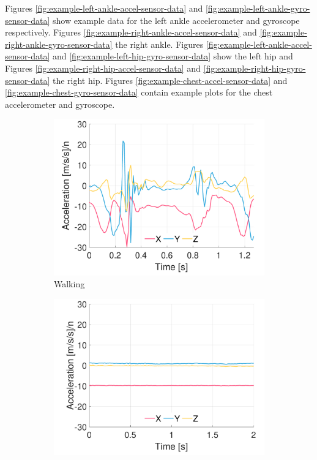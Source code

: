 Figures \ref{fig:example-left-ankle-accel-sensor-data} and \ref{fig:example-left-ankle-gyro-sensor-data} show example data for the left ankle accelerometer and gyroscope respectively. Figures \ref{fig:example-right-ankle-accel-sensor-data} and \ref{fig:example-right-ankle-gyro-sensor-data} the right ankle. Figures \ref{fig:example-left-ankle-accel-sensor-data} and \ref{fig:example-left-hip-gyro-sensor-data} show the left hip and Figures \ref{fig:example-right-hip-accel-sensor-data} and \ref{fig:example-right-hip-gyro-sensor-data} the right hip. Figures \ref{fig:example-chest-accel-sensor-data} and \ref{fig:example-chest-gyro-sensor-data} contain example plots for the chest accelerometer and gyroscope.

\begin{figure}[p]
\centering
    \begin{subfigure}[b]{0.49\textwidth}
         \centering
         \includegraphics[width=\textwidth]{content/3-Methods/example-data/ch3_example_data_subject_01_l_ankle_accel_activity_walking.pdf}
         \caption{Walking}
    \end{subfigure}
    \begin{subfigure}[b]{0.49\textwidth}
         \centering
         \includegraphics[width=\textwidth]{content/3-Methods/example-data/ch3_example_data_subject_01_l_ankle_accel_activity_stop.pdf}

\end{subfigure}
\end{figure}
